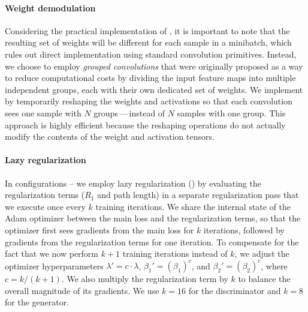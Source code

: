 \paragraph{Weight demodulation}
Considering the practical implementation of , it is important to note that the resulting set of weights will be different for each sample in a minibatch, which rules out direct implementation using standard convolution primitives.
Instead, we choose to employ \emph{grouped convolutions} \cite{krizhevsky2012} that were originally proposed as a way to reduce computational costs by dividing the input feature maps into multiple independent groups, each with their own dedicated set of weights.
We implement  by temporarily reshaping the weights and activations so that each convolution sees one sample with $N$ groups\,---\,instead of $N$ samples with one group.
This approach is highly efficient because the reshaping operations do not actually modify the contents of the weight and activation tensors.

\paragraph{Lazy regularization}
In configurations -- we employ lazy regularization () by evaluating the regularization terms ($R_1$ and path length) in a separate regularization pass that we execute once every $k$ training iterations.
We share the internal state of the Adam optimizer between the main loss and the regularization terms, so that the optimizer first sees gradients from the main loss for $k$ iterations, followed by gradients from the regularization terms for one iteration.
To compensate for the fact that we now perform $k+1$ training iterations instead of $k$, we adjust the optimizer hyperparameters $\lambda' = c\cdot\lambda$, $\beta_1' = (\beta_1)^c$, and $\beta_2' = (\beta_2)^c$, where $c = k/(k+1)$.
We also multiply the regularization term by $k$ to balance the overall magnitude of its gradients.
We use $k=16$ for the discriminator and $k=8$ for the generator.


